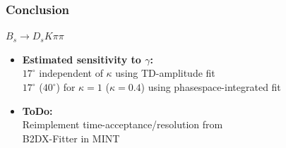 \documentclass{beamer}
\begin{document}
\begin{frame}
	\frametitle{Conclusion}
	
	\begin{block}{$B_s \to D_s K \pi \pi$}
	\begin{itemize}
		\item \textbf{Estimated sensitivity to $\gamma$:}\\ 
		 $17^{\circ}$ independent of $\kappa$ using TD-amplitude fit \\
		  $17^{\circ}$ ($40^{\circ}$) for $\kappa = 1$ ($\kappa = 0.4$) using phasespace-integrated fit
		\item \textbf{ToDo:}
		\\ Reimplement time-acceptance/resolution from \\ B2DX-Fitter in MINT
	\end{itemize}
		\end{block}

\end{frame}
\end{document}
